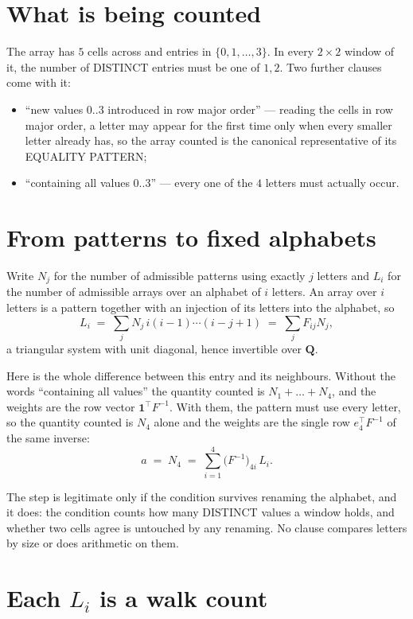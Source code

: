 \documentclass[11pt,a4paper]{article}
\theoremstyle{plain}
\theoremstyle{definition}
\begin{document}
\section{What is being counted}

The array has $5$ cells across and entries in $\{0,1,\dots,3\}$. In every
$2\times2$ window of it, the number of DISTINCT entries must be one of $1, 2$. Two
further clauses come with it:

\begin{itemize}
\item ``new values $0..3$ introduced in row major order'' --- reading the cells in row major
order, a letter may appear for the first time only when every smaller letter already has, so
the array counted is the canonical representative of its EQUALITY PATTERN;
\item ``containing all values $0..3$'' --- every one of the $4$ letters must actually
occur.
\end{itemize}


\section{From patterns to fixed alphabets}

Write $N_j$ for the number of admissible patterns using exactly $j$ letters and $L_i$ for the
number of admissible arrays over an alphabet of $i$ letters. An array over $i$ letters is a
pattern together with an injection of its letters into the alphabet, so
\[
L_i\;=\;\sum_{j} N_j\,i(i-1)\cdots(i-j+1)\;=\;\sum_j F_{ij}N_j ,
\]
a triangular system with unit diagonal, hence invertible over $\mathbf{Q}$.

Here is the whole difference between this entry and its neighbours. Without the words
``containing all values'' the quantity counted is $N_1+\dots+N_{4}$, and the weights are
the row vector $\mathbf{1}^{\!\top}F^{-1}$. With them, the pattern must use every letter,
so the quantity counted is $N_{4}$ alone and the weights are the single row
$e_{4}^{\!\top}F^{-1}$ of the same inverse:
\[
a\;=\;N_{4}\;=\;\sum_{i=1}^{4}\bigl(F^{-1}\bigr)_{4i}\,L_i .
\]

The step is legitimate only if the condition survives renaming the alphabet, and it does: the
condition counts how many DISTINCT values a window holds, and whether two cells agree is
untouched by any renaming. No clause compares letters by size or does arithmetic on them.

\section{Each $L_i$ is a walk count}
\end{document}
